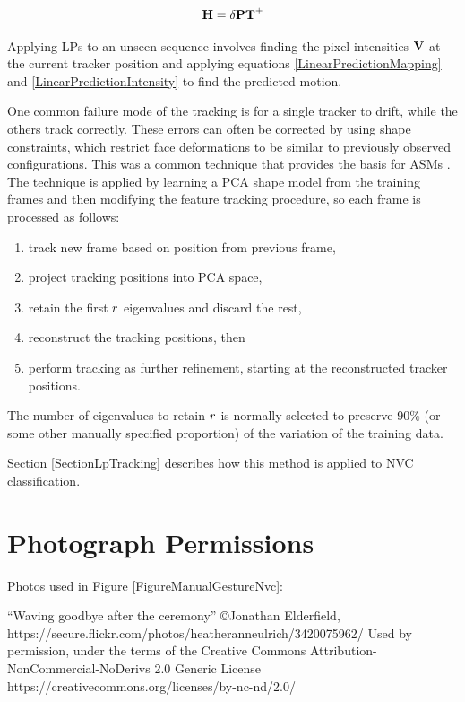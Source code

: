 \begin{appendices}
\begin{gather}
\textbf{H} = \delta \textbf{P} \textbf{T}^{+}
\end{gather}

Applying \ac{LP}s to an unseen sequence involves finding the pixel intensities $\textbf{V}$ at the current tracker position and applying equations \ref{LinearPredictionMapping} and \ref{LinearPredictionIntensity} to find the predicted motion.

One common failure mode of the tracking is for a single tracker to drift, while the others track correctly. These errors can often be corrected by using shape constraints, which restrict face deformations to be similar to previously observed configurations. This was a common technique that provides the basis for \ac{ASM}s \cite{Cootes1992}. The technique is applied by learning a PCA shape model from the training frames and then modifying the feature tracking procedure, so each frame is processed as follows:

\begin{enumerate}
 \item track new frame based on position from previous frame,
 \item project tracking positions into PCA space,
 \item retain the first $r$ eigenvalues and discard the rest,
 \item reconstruct the tracking positions, then
 \item perform tracking as further refinement, starting at the reconstructed tracker positions.
\end{enumerate}

The number of eigenvalues to retain $r$ is normally selected to preserve 90\% (or some other manually specified proportion) of the variation of the training data.

Section \ref{SectionLpTracking} describes how this method is applied to \ac{NVC} classification.

\chapter{Photograph Permissions}
\label{AppendixPhotoPermissions}

Photos used in Figure \ref{FigureManualGestureNvc}:

``Waving goodbye after the ceremony'' \copyright Jonathan Elderfield, \newline
https://secure.flickr.com/photos/heatheranneulrich/3420075962/ \newline
Used by permission, under the terms of the Creative Commons Attribution-NonCommercial-NoDerivs 2.0 Generic License \newline
https://creativecommons.org/licenses/by-nc-nd/2.0/


\end{appendices}
